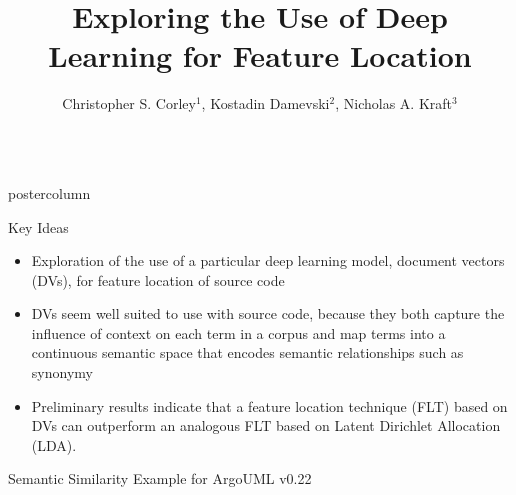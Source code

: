 \documentclass[final]{beamer} %
\title[Deep Learning for Feature Location]{Exploring the Use of Deep Learning for Feature Location}
\author[Corley et al.]{Christopher S. Corley$^{1}$, Kostadin Damevski$^2$, Nicholas A. Kraft$^3$}
\institute[]{$^1$University of Alabama \\
               $^2$Virginia Commonwealth University \\
               $^3$ABB Corporate Research}
\date{}
\begin{document}
  \begin{frame}


  \begin{columns}[t]
    \begin{column}{.49\textwidth}
      \begin{beamercolorbox}[center,wd=\textwidth]{postercolumn}
        \begin{minipage}[T]{.95\textwidth}  %


            \begin{block}{Key Ideas}
              \begin{itemize}
                \item 
                  Exploration of the use of a particular deep learning model, document vectors (DVs), for feature location of source code
                \item
                  DVs seem well suited to use with source code,
                  because they both capture the influence of context
                  on each term in a corpus and map terms into a
                  continuous semantic space that encodes semantic
                  relationships such as synonymy
               \item
                  Preliminary results indicate that a feature
                  location technique (FLT) based on DVs can outperform
                  an analogous FLT based on Latent Dirichlet
                  Allocation (LDA).
              \end{itemize}              
             \end{block}
 

            \vskip 1cm


            \begin{block}{Semantic Similarity Example for ArgoUML v0.22}
              

\end{block}
\end{minipage}
\end{beamercolorbox}
\end{column}
\end{columns}
\end{frame}
\end{document}
